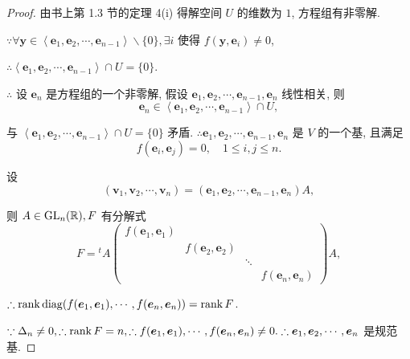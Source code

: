 \documentclass[color=black,device=normal,lang=cn,mode=geye]{elegantnote}
\begin{document}
\begin{proof}
    由书上第 1.3 节的定理 4(i) 得解空间 $U$ 的维数为 $1$, 方程组有非零解.

    $\because\forall\boldsymbol{y}\in\left<\boldsymbol{e}_1,\boldsymbol{e}_2,\cdots,\boldsymbol{e}_{n-1}\right>\backslash\{0\},\exists i$ 使得 $f(\boldsymbol{y},\boldsymbol{e}_i)\neq0$,
    
    $\therefore\left<\boldsymbol{e}_1,\boldsymbol{e}_2,\cdots,\boldsymbol{e}_{n-1}\right>\cap U=\{0\}$.

    $\therefore$ 设 $\boldsymbol{e}_n$ 是方程组的一个非零解, 假设 $\boldsymbol{e}_1,\boldsymbol{e}_2,\cdots,\boldsymbol{e}_{n-1},\boldsymbol{e}_n$ 线性相关, 则
    \[\boldsymbol{e}_n\in\left<\boldsymbol{e}_1,\boldsymbol{e}_2,\cdots,\boldsymbol{e}_{n-1}\right>\cap U,\]

    与 $\left<\boldsymbol{e}_1,\boldsymbol{e}_2,\cdots,\boldsymbol{e}_{n-1}\right>\cap U=\{0\}$ 矛盾. $\therefore\boldsymbol{e}_1,\boldsymbol{e}_2,\cdots,\boldsymbol{e}_{n-1},\boldsymbol{e}_n$ 是 $V$ 的一个基, 且满足
    \[f(\boldsymbol{e}_i,\boldsymbol{e}_j)=0,\quad1\leq i,j\leq n.\]
    
    设
    \[(\boldsymbol{v}_1,\boldsymbol{v}_2,\cdots,\boldsymbol{v}_n)=(\boldsymbol{e}_1,\boldsymbol{e}_2,\cdots,\boldsymbol{e}_{n-1},\boldsymbol{e}_n)A,\]

    则 $A\in\operatorname{GL} _n(\mathbb{R}),F$ 有分解式
    \begin{equation}\label{eq3.3}
        F={}^tA\begin{pmatrix}
            f(\boldsymbol{e}_1,\boldsymbol{e}_1) \\
            & f(\boldsymbol{e}_2,\boldsymbol{e}_2) \\
            && \ddots \\
            &&& f(\boldsymbol{e}_n,\boldsymbol{e}_n)
        \end{pmatrix}A,
    \end{equation}

    $\therefore\operatorname{rank} \operatorname{diag} (f(\boldsymbol{e}_1,\boldsymbol{e}_1),\cdots,f(\boldsymbol{e}_n,\boldsymbol{e}_n))=\operatorname{rank} F$.

    $\because\Delta_n\neq0,\therefore\operatorname{rank} F=n,\therefore f(\boldsymbol{e}_1,\boldsymbol{e}_1),\cdots,f(\boldsymbol{e}_n,\boldsymbol{e}_n)\neq0.\therefore\boldsymbol{e}_1,\boldsymbol{e}_2,\cdots,\boldsymbol{e}_n$ 是规范基.


\end{proof}
\end{document}
